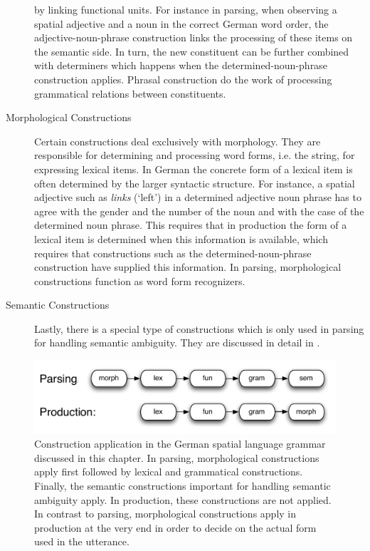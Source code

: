 \begin{description}
by linking functional units. For instance in parsing, when observing
a spatial adjective and a noun in the correct German word order, the adjective-noun-phrase
construction links the processing of these items on the semantic side.
In turn, the new constituent can be further combined with determiners which
happens when the determined-noun-phrase construction applies.
Phrasal construction do the work of processing grammatical
relations between constituents. 
\item[Morphological Constructions] Certain constructions deal
exclusively with morphology. They are responsible for determining and 
processing word forms, i.e. the string, for expressing lexical items. In German
the concrete form of a lexical item is often determined by the larger
syntactic structure. For instance, a spatial adjective such as \textit{links} (`left') in
a determined adjective noun phrase has to agree with the gender and the number
of the noun and with the case of the determined noun phrase. This requires 
that in production the form of a lexical item is determined when this information
is available, which requires that constructions such as the determined-noun-phrase
construction have supplied this information. In parsing, morphological constructions
function as word form recognizers.
\item[Semantic Constructions] Lastly, there is a special type of constructions 
which is only used in parsing for handling semantic ambiguity. They are 
discussed in detail in .
\end{description}

\begin{figure}
\begin{center}
\includegraphics[width=.8\textwidth]{figs/cxn-application}
\end{center}
\caption[Construction application]{%
Construction application in the German spatial language 
grammar discussed in this chapter. In parsing,
morphological constructions apply first followed by lexical and 
grammatical constructions. Finally, the semantic constructions
important for handling semantic ambiguity apply. In 
production, these constructions are 
not applied. In contrast to parsing, morphological constructions apply in 
production at the very end in order to decide on the actual 
form used in the utterance.}
\label{f:construction-application}
\end{figure}

